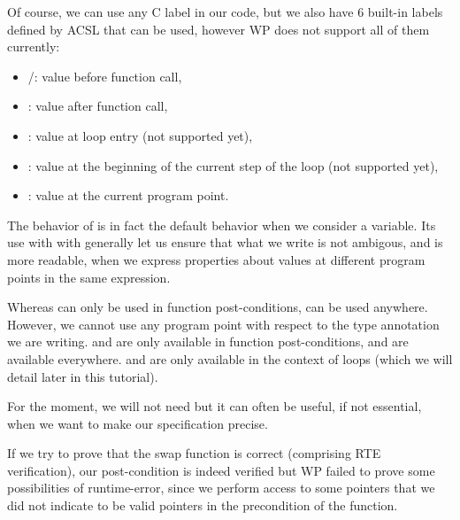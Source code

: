 \documentclass[middle]{zmdocument}
\begin{document}
Of course, we can use any C label in our code, but we also have 6
built-in labels defined by ACSL that can be used, however WP does not
support all of them currently:



\begin{itemize}
\item {}/: value before function call,
\item {}: value after function call,
\item {}: value at loop entry (not supported yet),
\item {}: value at the beginning of the current step of
  the loop (not supported yet),
\item {}: value at the current program point.
\end{itemize}


\begin{Information}
  The behavior of  is in fact the default behavior when we
  consider a variable. Its use with  with
  generally let us ensure that what we write is not ambigous, and is more
  readable, when we express properties about values at different program
  points in the same expression.
\end{Information}


Whereas  can only be used in function
post-conditions,  can be used anywhere.
However, we cannot use any program point with respect to the type
annotation we are writing.  and  are only
available in function post-conditions,  and 
are available everywhere.  and 
are only available in the context of loops (which we will detail later
in this tutorial).



For the moment, we will not need  but it can
often be useful, if not essential, when we want to make our
specification precise.





If we try to prove that the swap function is correct (comprising RTE
verification), our post-condition is indeed verified but WP failed to
prove some possibilities of runtime-error, since we perform access to
some pointers that we did not indicate to be valid pointers in the
precondition of the function.
\end{document}
